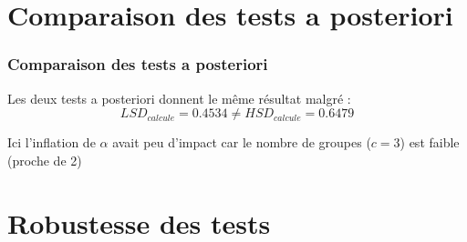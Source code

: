 \documentclass{beamer}
\begin{document}
\section{Comparaison des tests a posteriori}
\begin{frame}
	\frametitle{Comparaison des tests a posteriori}
	\phantom{}
	Les deux tests a posteriori donnent le même résultat malgré :
	\[LSD_{calcule} = 0.4534 \ne HSD_{calcule} = 0.6479 \]
	
	Ici l'inflation de $ \alpha $ avait peu d'impact car le nombre de groupes ($ c = 3 $) est faible (proche de 2)	
	
	\begin{figure}[H]
	\centering
	    \qquad
    \end{figure}

\end{frame}

\section{Robustesse des tests}
\end{document}
